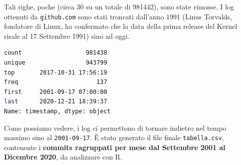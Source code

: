 \documentclass[11pt,a4paper]{article}
\begin{document}
Tali righe, poche (circa 30 su un totale di 981442), sono state rimosse. I log
ottenuti da \texttt{github.com} sono stati troncati dall'anno 1991 (Linus
Torvalds, fondatore di Linux, ha confermato che la data della prima release del
Kernel risale al 17 Settembre 1991) sino ad oggi.
\begin{lstlisting}[language=bash,basicstyle=\scriptsize,tabsize=2,frame = single]
count                  981438
unique                 943799
top       2017-10-31 17:56:19
freq                      137
first     2001-09-17 07:00:00
last      2020-12-21 18:39:37
Name: timestamp, dtype: object
\end{lstlisting}
Come possiamo vedere, i log ci permettono di tornare indietro nel tempo massimo
sino al \texttt{2001-09-17}. \`E stato generato il file finale
\texttt{tabella.csv}, contenente i \textbf{commits ragruppati per mese dal
Settembre 2001 al Dicembre 2020}, da analizzare con R.
\end{document}
